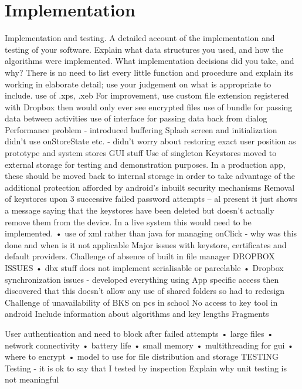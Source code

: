 
\chapter{Implementation}
\label{cha:imp}
Implementation and testing. A detailed account of the implementation and testing of your software. Explain what data structures you used, and how the algorithms were implemented. What implementation decisions did you take, and why? There is no need to list every little function and procedure and explain its working in elaborate detail; use your judgement on what is appropriate to include. 
use of .xps, .xeb
For improvement, use custom file extension registered with Dropbox then would only ever see encrypted files
use of bundle for passing data between activities
use of interface for passing data back from dialog
Performance problem - introduced buffering
Splash screen and initialization
didn't use onStoreState etc. - didn't worry about restoring exact user position as prototype and system stores GUI stuff
Use of singleton
Keystores moved to external storage for testing and demonstration purposes.  In a production app, these should be moved back to internal storage in order to take advantage of the additional protection afforded by android’s inbuilt security mechanisms
Removal of keystores upon 3 successive failed password attempts – al present it just shows a message saying that the keystores have been deleted but doesn’t actually remove them from the device.  In a live system this would need to be implemented.
• use of xml rather than java for managing onClick - why was this done and when is it not applicable
Major issues with keystore, certificates and default providers.
Challenge of absence of built in file manager
DROPBOX ISSUES
• dbx stuff does not implement serialisable or parcelable
• Dropbox synchronization issues - developed everything using App specific access then discovered that this doesn't allow any use of shared folders so had to redesign 
Challenge of unavailability of BKS on pcs in school
No access to key tool in android
Include information about algorithms and key lengths
Fragments

User authentication and need to block after failed attempts
• large files
• network connectivity
• battery life
• small memory
• multithreading for gui
• where to encrypt
• model to use for file distribution and storage
TESTING
Testing - it is ok to say that I tested by inspection
Explain why unit testing is not meaningful

